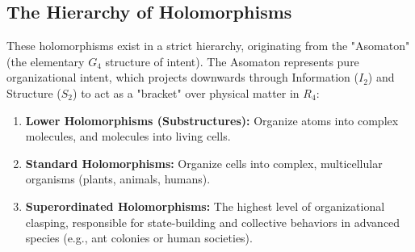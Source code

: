 \documentclass[11pt,a4paper,oneside]{article}
\begin{document}
\subsection{The Hierarchy of Holomorphisms}

These holomorphisms exist in a strict hierarchy, originating from the "Asomaton" (the elementary $G_4$ structure of intent). The Asomaton represents pure organizational intent, which projects downwards through Information ($I_2$) and Structure ($S_2$) to act as a "bracket" over physical matter in $R_4$:

\begin{enumerate}
    \item \textbf{Lower Holomorphisms (Substructures):} Organize atoms into complex molecules, and molecules into living cells.
    \item \textbf{Standard Holomorphisms:} Organize cells into complex, multicellular organisms (plants, animals, humans).
    \item \textbf{Superordinated Holomorphisms:} The highest level of organizational clasping, responsible for state-building and collective behaviors in advanced species (e.g., ant colonies or human societies).
\end{enumerate}
\end{document}
